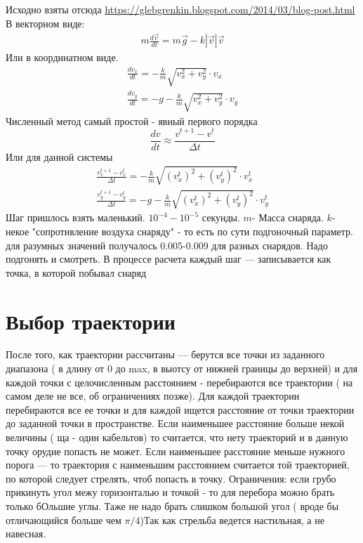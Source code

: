 \documentclass{article}
\begin{document}
Исходно взяты отсюда \url{https://glebgrenkin.blogspot.com/2014/03/blog-post.html}
В векторном виде:
\begin{eqnarray}
	m\frac{d{\vec v} }{dt}= m{\vec g}- k |{\vec v}|{\vec v}
\end{eqnarray}
Или в координатном виде.
\begin{eqnarray}
	\frac{dv_x}{dt}=-\frac{k}{m}\sqrt{v_x^2+v_y^2}\cdot v_x \\
	\frac{dv_y}{dt}=-g-\frac{k}{m}\sqrt{v_x^2+v_y^2}\cdot v_y	
\end{eqnarray}
Численный метод самый простой - явный первого порядка
\begin{equation}
	\frac{dv}{dt} \approx \frac{v^{t+1}-v^t}{\Delta t}
\end{equation}
Или для данной системы
\begin{eqnarray}
	\frac{v^{t+1}_x-v^t_x}{\Delta t}=-\frac{k}{m}\sqrt{(v^t_x)^2+(v^t_y)^2}\cdot v^t_x \\
	\frac{v^{t+1}_y-v^t_y}{\Delta t}=-g-\frac{k}{m}\sqrt{(v^t_x)^2+(v^t_y)^2}\cdot v^t_y	
\end{eqnarray}
Шаг пришлось взять маленький. $10^{-4}-10^{-5}$ секунды.
$m$- Масса снаряда. $k$- некое "сопротивление воздуха снаряду" - то есть по сути подгоночный параметр. для разумных значений получалось 0.005-0.009 для разных снарядов. Надо подгонять и смотреть.
В процессе расчета каждый шаг --- записывается как точка, в которой побывал снаряд
\section{Выбор траектории}

После того, как траектории рассчитаны --- берутся все точки из заданного диапазона ( в длину от 0 до max, в выотсу от нижней границы до верхней) и для каждой точки с целочисленным расстоянием - перебираются все траектории ( на самом деле не все, об ограничениях позже). Для каждой траектории перебираются все ее точки и для каждой ищется расстояние от точки траектории до заданной точки в пространстве. Если наименьшее расстояние больше некой величины ( ща - один кабельтов) то считается, что нету траекторий и в данную точку орудие попасть не может. Если наименьшее расстояние меньше нужного порога --- то траектория с наименьшим расстоянием считается той траекторией, по которой следует стрелять, чтоб попасть в точку. 
Ограничения: если грубо прикинуть угол межу горизонталью и точкой - то для перебора можно брать только бОльшие углы. Таже не надо брать слишком большой угол ( вроде бы отличающийся больше чем $\pi/4$)Так как стрельба ведется настильная, а не навесная.
\end{document}
